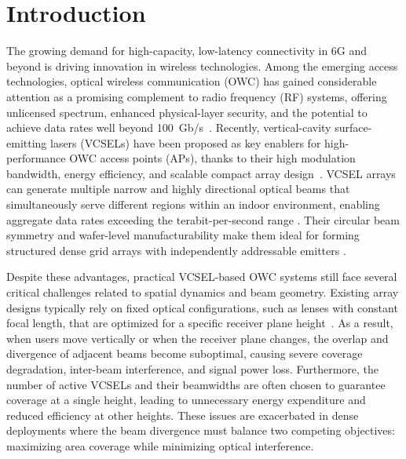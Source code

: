 \documentclass[twocolumn,twoside]{IEEEtran}
\theoremstyle{break}
\begin{document}
\section{Introduction}

The growing demand for high-capacity, low-latency connectivity in 6G and beyond is driving innovation in wireless technologies. Among the emerging access technologies, optical wireless communication (OWC) has gained considerable attention as a promising complement to radio frequency (RF) systems, offering unlicensed spectrum, enhanced physical-layer security, and the potential to achieve data rates well beyond 100~Gb/s~\cite{6G-NoN1,6G-2}. Recently, vertical-cavity surface-emitting lasers (VCSELs) have been proposed as key enablers for high-performance OWC access points (APs), thanks to their high modulation bandwidth, energy efficiency, and scalable compact array design~\cite{VCSELbook, LiFi2}. VCSEL arrays can generate multiple narrow and highly directional optical beams that simultaneously serve different regions within an indoor environment, enabling aggregate data rates exceeding the terabit-per-second range \cite{LiFi2}. Their circular beam symmetry and wafer-level manufacturability make them ideal for forming structured dense grid arrays with independently addressable emitters \cite{VCSEL1}.

Despite these advantages, practical VCSEL-based OWC systems still face several critical challenges related to spatial dynamics and beam geometry. Existing array designs typically rely on fixed optical configurations, such as lenses with constant focal length, that are optimized for a specific receiver plane height~\cite{VCSEL1,VCSEL2,VCSEL3}. As a result, when users move vertically or when the receiver plane changes, the overlap and divergence of adjacent beams become suboptimal, causing severe coverage degradation, inter-beam interference, and signal power loss. Furthermore, the number of active VCSELs and their beamwidths are often chosen to guarantee coverage at a single height, leading to unnecessary energy expenditure and reduced efficiency at other heights. These issues are exacerbated in dense deployments where the beam divergence must balance two competing objectives: maximizing area coverage while minimizing optical interference.
\end{document}

